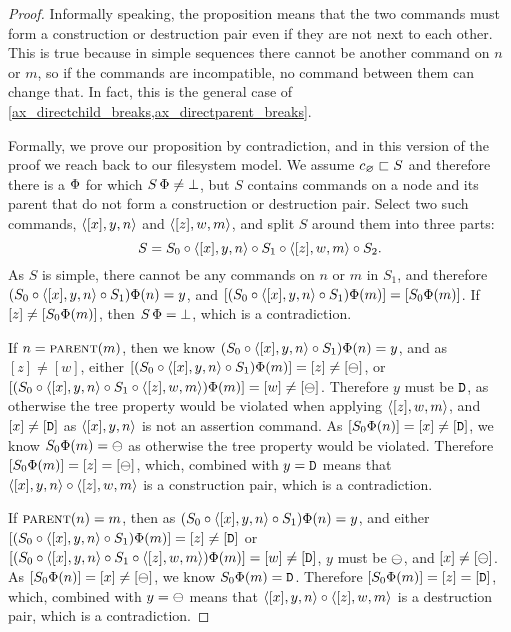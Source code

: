 \begin{proof}
Informally speaking, the proposition means that
the two commands must form a construction or destruction pair even
if they are not next to each other.
This is true because in simple sequences
there cannot be another command on $n$ or $m$,
so if the commands are incompatible, no command between them can change that.
In fact, this  is the general case
of \cref{ax_directchild_breaks,ax_directparent_breaks}.

Formally, we prove our proposition by contradiction,
and in this version of the proof we reach back to our filesystem model.
We assume $c_\varnothing\sqsubset{S}$ and therefore there is a $\Phi$ for which $S\,\Phi\neq\bot$,
but $S$ contains commands on a node and its parent that do not form a construction or destruction pair.
Select two such commands, $\langle{[x],y,n}\rangle$ and $\langle{[z],w,m}\rangle$,
and split $S$ around them into three parts:
\[ S = S_0 \circ \langle{[x],y,n}\rangle \circ S_1 \circ \langle{[z],w,m}\rangle \circ S_2. \]
As $S$ is simple, there cannot be any commands on $n$ or $m$ in $S_1$,
and therefore $(S_0\circ\langle{[x],y,n}\rangle\circ S_1)\Phi(n) = y$,
and $[(S_0\circ\langle{[x],y,n}\rangle\circ S_1)\Phi(m)] = [S_0\Phi(m)]$.
If $[z]\neq[S_0\Phi(m)]$, then $S\,\Phi=\bot$, which is a contradiction.

If $n=\text{\normalfont\scshape{parent}}(m)$, then 
we know $(S_0\circ\langle{[x],y,n}\rangle\circ S_1)\Phi(n) = y$, and as $[z]\neq[w]$, either
$[(S_0\circ\langle{[x],y,n}\rangle\circ S_1)\Phi(m)]=[z]\neq[\ominus]$,
or $[(S_0\circ\langle{[x],y,n}\rangle\circ S_1\circ\langle{[z],w,m}\rangle)\Phi(m)]=[w]\neq[\ominus]$.
Therefore $y$ must be $\mathtt{D}$, as otherwise the tree property would be violated
when applying $\langle{[z],w,m}\rangle$,
and $[x]\neq[\mathtt{D}]$ as $\langle{[x],y,n}\rangle$ is not an assertion command.
As $[S_0\Phi(n)]=[x]\neq[\mathtt{D}]$, we know
$S_0\Phi(m)=\ominus$ as otherwise the tree property would be violated.
Therefore $[S_0\Phi(m)]=[z]=[\ominus]$, which, combined with $y=\mathtt{D}$
means that $\langle{[x],y,n}\rangle\circ\langle{[z],w,m}\rangle$ is a construction pair, which is a contradiction.

If $\text{\normalfont\scshape{parent}}(n)=m$, then 
as $(S_0\circ\langle{[x],y,n}\rangle\circ S_1)\Phi(n) = y$, and either
$[(S_0\circ\langle{[x],y,n}\rangle\circ S_1)\Phi(m)]=[z]\neq[\mathtt{D}]$
or $[(S_0\circ\langle{[x],y,n}\rangle\circ S_1\circ\langle{[z],w,m}\rangle)\Phi(m)]=[w]\neq[\mathtt{D}]$,
$y$ must be $\ominus$, and $[x]\neq[\ominus]$.
As $[S_0\Phi(n)]=[x]\neq[\ominus]$, we know $S_0\Phi(m)=\mathtt{D}$.
Therefore $[S_0\Phi(m)]=[z]=[\mathtt{D}]$, which, combined with $y=\ominus$
means that $\langle{[x],y,n}\rangle\circ\langle{[z],w,m}\rangle$ is a destruction pair, which is a contradiction.
\end{proof}



